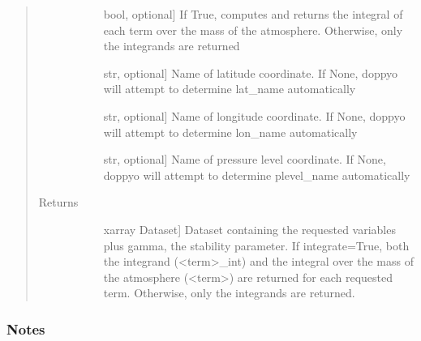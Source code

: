 \documentclass[letterpaper,10pt,english]{sphinxmanual}
\begin{document}
\begin{fulllineitems}
\begin{quote}
\begin{description}
\begin{description}
\item[{}] \leavevmode{[}bool, optional{]}
If True, computes and returns the integral of each term over the mass of the atmosphere. Otherwise,                     only the integrands are returned

\item[{}] \leavevmode{[}str, optional{]}
Name of latitude coordinate. If None, doppyo will attempt to determine lat\_name                     automatically

\item[{}] \leavevmode{[}str, optional{]}
Name of longitude coordinate. If None, doppyo will attempt to determine lon\_name                     automatically

\item[{}] \leavevmode{[}str, optional{]}
Name of pressure level coordinate. If None, doppyo will attempt to determine plevel\_name                    automatically

\end{description}

\item[{Returns}] \leavevmode\begin{description}
\item[{}] \leavevmode{[}xarray Dataset{]}
Dataset containing the requested variables plus gamma, the stability parameter. If integrate=True,                     both the integrand (\textless{}term\textgreater{}\_int) and the integral over the mass of the atmosphere (\textless{}term\textgreater{}) are                     returned for each requested term. Otherwise, only the integrands are returned.

\end{description}

\end{description}\end{quote}
\subsubsection*{Notes}


\end{fulllineitems}
\end{document}
